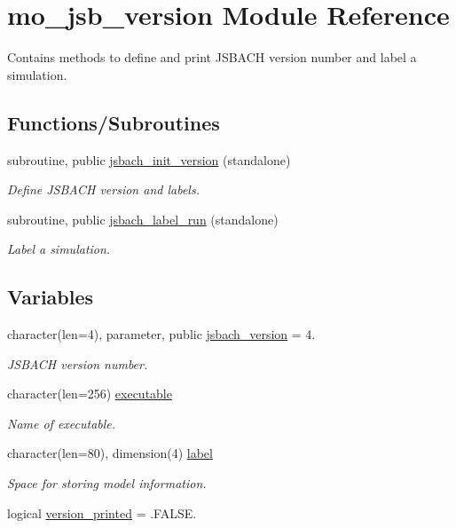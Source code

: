 \hypertarget{namespacemo__jsb__version}{}\section{mo\+\_\+jsb\+\_\+version Module Reference}
\label{namespacemo__jsb__version}


Contains methods to define and print J\+S\+B\+A\+C\+H version number and label a simulation.  


\subsection*{Functions/\+Subroutines}
\begin{DoxyCompactItemize}
\item 
subroutine, public \hyperlink{namespacemo__jsb__version_ab847bc6225ad7fa0b42380b0a4efd458}{jsbach\+\_\+init\+\_\+version} (standalone)
\begin{DoxyCompactList}\small\item\em Define J\+S\+B\+A\+C\+H version and labels. \end{DoxyCompactList}\item 
subroutine, public \hyperlink{namespacemo__jsb__version_a7fd0292d048178f3a31599a2a7eff6fb}{jsbach\+\_\+label\+\_\+run} (standalone)
\begin{DoxyCompactList}\small\item\em Label a simulation. \end{DoxyCompactList}\end{DoxyCompactItemize}
\subsection*{Variables}
\begin{DoxyCompactItemize}
\item 
character(len=4), parameter, public \hyperlink{namespacemo__jsb__version_acea3b0d7b36fbbac26065f23eff8584d}{jsbach\+\_\+version} = \textquotesingle{}4.\textquotesingle{}
\begin{DoxyCompactList}\small\item\em J\+S\+B\+A\+C\+H version number. \end{DoxyCompactList}\item 
character(len=256) \hyperlink{namespacemo__jsb__version_a8009d55d2d2f77172d38a83ad2b59efc}{executable}
\begin{DoxyCompactList}\small\item\em Name of executable. \end{DoxyCompactList}\item 
character(len=80), dimension(4) \hyperlink{namespacemo__jsb__version_a65699e250219835c1bcfd563841df67b}{label}
\begin{DoxyCompactList}\small\item\em Space for storing model information. \end{DoxyCompactList}\item 
logical \hyperlink{namespacemo__jsb__version_af0c80a14a6251abea4b1cf5462dedc25}{version\+\_\+printed} = .F\+A\+L\+S\+E.
\end{DoxyCompactItemize}


